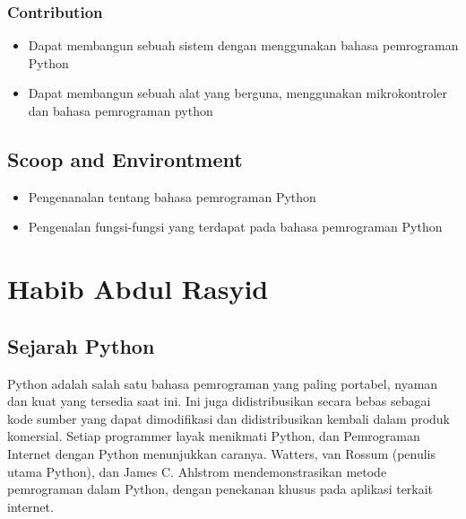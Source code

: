         \subsubsection{Contribution}
            \begin{itemize}
                \item Dapat membangun sebuah sistem dengan menggunakan bahasa pemrograman Python
                \item Dapat membangun sebuah alat yang berguna, menggunakan mikrokontroler dan bahasa pemrograman python
            \end{itemize}

    \subsection{Scoop and Environtment}
        \begin{itemize}
            \item Pengenanalan tentang bahasa pemrograman Python
            \item Pengenalan fungsi-fungsi yang terdapat pada bahasa pemrograman Python
        \end{itemize}
\section{Habib Abdul Rasyid}
\subsection{Sejarah Python}
Python adalah salah satu bahasa pemrograman yang paling portabel, nyaman dan kuat yang tersedia saat ini. Ini juga didistribusikan secara bebas sebagai kode sumber yang dapat dimodifikasi dan didistribusikan kembali dalam produk komersial. Setiap programmer layak menikmati Python, dan Pemrograman Internet dengan Python menunjukkan caranya. Watters, van Rossum (penulis utama Python), dan James C. Ahlstrom mendemonstrasikan metode pemrograman dalam Python, dengan penekanan khusus pada aplikasi terkait internet\cite{watters1996internet}.
\par
